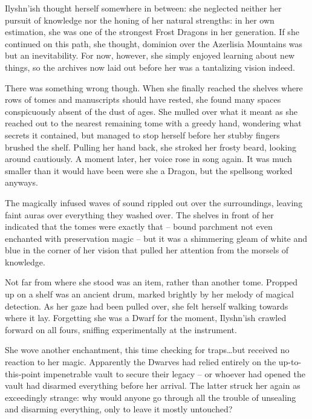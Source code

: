  

Ilyshn’ish thought herself somewhere in between: she neglected neither her pursuit of knowledge nor the honing of her natural strengths: in her own estimation, she was one of the strongest Frost Dragons in her generation. If she continued on this path, she thought, dominion over the Azerlisia Mountains was but an inevitability. For now, however, she simply enjoyed learning about new things, so the archives now laid out before her was a tantalizing vision indeed.

 

There was something wrong though. When she finally reached the shelves where rows of tomes and manuscripts should have rested, she found many spaces conspicuously absent of the dust of ages. She mulled over what it meant as she reached out to the nearest remaining tome with a greedy hand, wondering what secrets it contained, but managed to stop herself before her stubby fingers brushed the shelf. Pulling her hand back, she stroked her frosty beard, looking around cautiously. A moment later, her voice rose in song again. It was much smaller than it would have been were she a Dragon, but the spellsong worked anyways.

 

The magically infused waves of sound rippled out over the surroundings, leaving faint auras over everything they washed over. The shelves in front of her indicated that the tomes were exactly that – bound parchment not even enchanted with preservation magic – but it was a shimmering gleam of white and blue in the corner of her vision that pulled her attention from the morsels of knowledge.

 

Not far from where she stood was an item, rather than another tome. Propped up on a shelf was an ancient drum, marked brightly by her melody of magical detection. As her gaze had been pulled over, she felt herself walking towards where it lay. Forgetting she was a Dwarf for the moment, Ilyshn’ish crawled forward on all fours, sniffing experimentally at the instrument.

 

She wove another enchantment, this time checking for traps…but received no reaction to her magic. Apparently the Dwarves had relied entirely on the up-to-this-point impenetrable vault to secure their legacy – or whoever had opened the vault had disarmed everything before her arrival. The latter struck her again as exceedingly strange: why would anyone go through all the trouble of unsealing and disarming everything, only to leave it mostly untouched?

